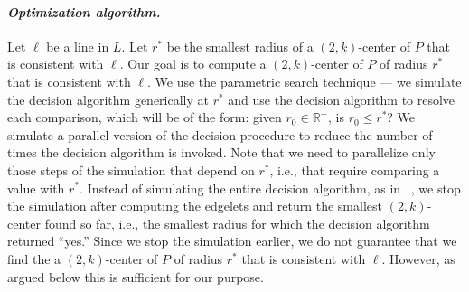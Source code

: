 \documentclass[11pt]{myclass}
\renewcommand{\b}[1]{\ensuremath{\mathbb{#1}}}
\begin{document}
\paragraph{\textbf{\emph{Optimization algorithm.}}}
Let $\ell$ be a line in $L$.  
Let $r^*$ be the smallest radius of a $(2,k)$-center of $P$ that is consistent with $\ell$.  
Our goal is to compute a $(2,k)$-center of $P$ of radius $r^*$ that is consistent with $\ell$.  
We use the parametric search technique \cite{Meg83} --- we simulate the decision algorithm generically at $r^*$ and use the decision algorithm to resolve each comparison, which will be of the form: given $r_0 \in \b{R}^+$, is $r_0 \leq r^*$?  We simulate a parallel version of the decision procedure to reduce the number of times the decision algorithm is invoked.
Note that we need to parallelize only those steps of the simulation that depend on $r^*$, i.e., that require comparing a value with $r^*$.  Instead of simulating the entire decision algorithm, as in ~\cite{Epp97}, we stop the simulation after computing the edgelets and return the smallest $(2,k)$-center found so far, i.e., the smallest radius for which the decision algorithm returned ``yes.''  Since we stop the simulation earlier, we do not guarantee that we find the a $(2,k)$-center of $P$ of radius $r^*$ that is consistent with $\ell$.  However, as argued below this is sufficient for our purpose.  
\end{document}
